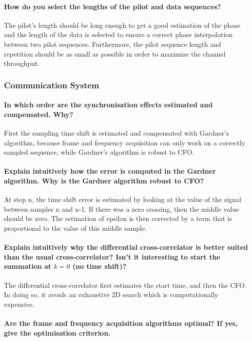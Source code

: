\paragraph{How do you select the lengths of the pilot and data sequences?} The pilot's length should be long enough to get a good estimation of the phase and the length of the data is selected to ensure a correct phase interpolation between two pilot sequences. Furthermore, the pilot sequence length and repetition should be as small as possible in order to maximize the channel throughput.

\subsubsection{Communication System}


\paragraph{In which order are the synchronisation effects estimated and compensated. Why?} First the sampling time shift is estimated and compensated with Gardner's algorithm, because frame and frequency acquisition can only work on a correctly sampled sequence, while Gardner's algorithm is robust to CFO.


\paragraph{Explain intuitively how the error is computed in the Gardner algorithm. Why is the
Gardner algorithm robust to CFO?} At step n, the time shift error is estimated by looking at the value of the signal between samples n and n-1. If there was a zero crossing, then the middle value should be zero. The estimation of epsilon is then corrected by a term that is proportional to the value of this middle sample.

\paragraph{Explain intuitively why the differential cross-correlator is better suited than the usual cross-correlator? Isn’t it interesting to start the summation at $k = 0$ (no time shift)?}
The differential cross-correlator first estimates the start time, and then the CFO. In doing so, it avoids an exhaustive 2D search which is computationally expensive.

\paragraph{Are the frame and frequency acquisition algorithms optimal? If yes, give the optimisation criterion.}
